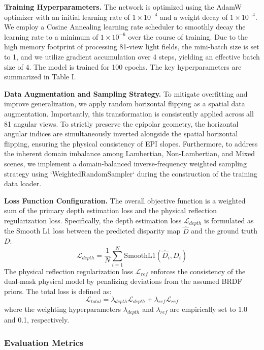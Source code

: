 \documentclass[lettersize,journal]{IEEEtran}
\begin{document}
\textbf{Training Hyperparameters.} 
The network is optimized using the AdamW optimizer with an initial learning rate of $1 \times 10^{-4}$ and a weight decay of $1 \times 10^{-4}$. We employ a Cosine Annealing learning rate scheduler to smoothly decay the learning rate to a minimum of $1 \times 10^{-6}$ over the course of training. Due to the high memory footprint of processing 81-view light fields, the mini-batch size is set to 1, and we utilize gradient accumulation over 4 steps, yielding an effective batch size of 4. The model is trained for 100 epochs. The key hyperparameters are summarized in Table I.

\textbf{Data Augmentation and Sampling Strategy.} 
To mitigate overfitting and improve generalization, we apply random horizontal flipping as a spatial data augmentation. Importantly, this transformation is consistently applied across all 81 angular views. To strictly preserve the epipolar geometry, the horizontal angular indices are simultaneously inverted alongside the spatial horizontal flipping, ensuring the physical consistency of EPI slopes. Furthermore, to address the inherent domain imbalance among Lambertian, Non-Lambertian, and Mixed scenes, we implement a domain-balanced inverse-frequency weighted sampling strategy using `WeightedRandomSampler` during the construction of the training data loader.

\textbf{Loss Function Configuration.} 
The overall objective function is a weighted sum of the primary depth estimation loss and the physical reflection regularization loss. Specifically, the depth estimation loss $\mathcal{L}_{depth}$ is formulated as the Smooth L1 loss between the predicted disparity map $\hat{D}$ and the ground truth $D$:
\begin{equation}
\label{eq:eq16}
\mathcal{L}_{depth} = \frac{1}{N} \sum_{i=1}^{N} \text{SmoothL1}(\hat{D}_i, D_i)
\end{equation}
The physical reflection regularization loss $\mathcal{L}_{ref}$ enforces the consistency of the dual-mask physical model by penalizing deviations from the assumed BRDF priors. The total loss is defined as:
\begin{equation}
\label{eq:eq17}
\mathcal{L}_{total} = \lambda_{depth} \mathcal{L}_{depth} + \lambda_{ref} \mathcal{L}_{ref}
\end{equation}
where the weighting hyperparameters $\lambda_{depth}$ and $\lambda_{ref}$ are empirically set to 1.0 and 0.1, respectively.

\subsubsection{Evaluation Metrics}
\end{document}
